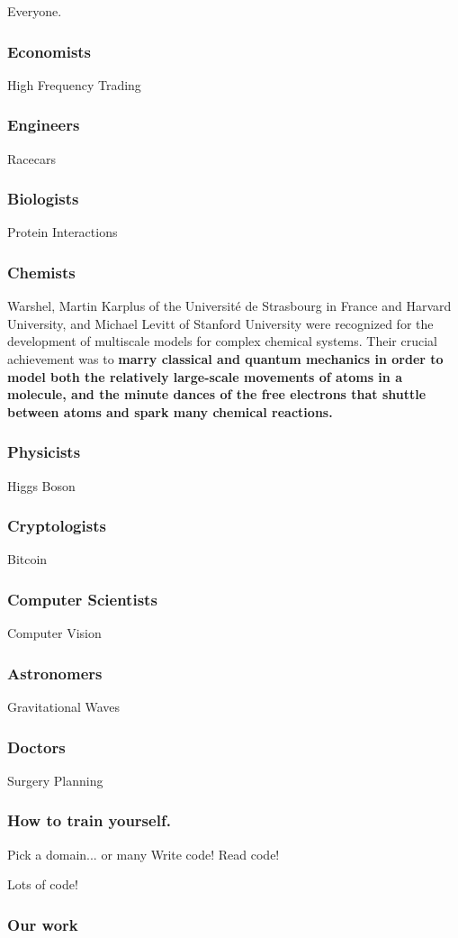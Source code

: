 \documentclass{beamer}
\begin{document}
\begin{frame}
  \center Everyone.
\end{frame}

\begin{frame}
  \frametitle{Economists}
  \center High Frequency Trading
\end{frame}

\begin{frame}
  \frametitle{Engineers}
  \center Racecars
\end{frame}

\begin{frame}
  \frametitle{Biologists}
  \center Protein Interactions
\end{frame}

\begin{frame}
  \frametitle{Chemists}
  \center 
  Warshel, Martin Karplus of the Université de Strasbourg in France and Harvard
  University, and Michael Levitt of Stanford University were recognized for 
  the development of multiscale models for complex chemical systems. Their crucial
  achievement was to {\bf marry classical and quantum mechanics in order to model
  both the relatively large-scale movements of atoms in a molecule, and the
  minute dances of the free electrons that shuttle between atoms and spark many
chemical reactions.}
\end{frame}

\begin{frame}
  \frametitle{Physicists}
  \center Higgs Boson
\end{frame}

\begin{frame}
  \frametitle{Cryptologists}
  \center Bitcoin
\end{frame}

\begin{frame}
  \frametitle{Computer Scientists}
  \center Computer Vision
\end{frame}

\begin{frame}
  \frametitle{Astronomers}
  \center Gravitational Waves
\end{frame}

\begin{frame}
  \frametitle{Doctors}
  \center Surgery Planning
\end{frame}

\begin{frame}
  \frametitle{How to train yourself.}
  \center Pick a domain... or many
  \center Write code!
  \center Read code!
\end{frame}

\begin{frame}
  \center Lots of code!
\end{frame}

\begin{frame}
  \frametitle{Our work}
\end{frame}
\end{document}
